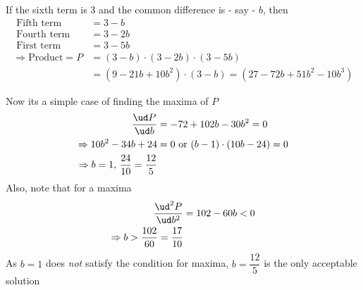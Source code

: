 \begin{solution}
	If the sixth term is 3 and the common difference is - say - $b$, then 
	\begin{align}
		\text{ Fifth term } &= 3-b \\
		\text{ Fourth term } &= 3-2b \\
		\text{ First term } &= 3-5b \\
		\Rightarrow \text{Product} = P &= (3-b)\cdot(3-2b)\cdot(3-5b) \\
		&= (9-21b+10b^2)\cdot(3-b) = (27-72b+51b^2-10b^3)
	\end{align}
	
	Now its a simple case of finding the maxima of $P$
	\begin{align}
		\dfrac{\ud P}{\ud b} &= -72 + 102b - 30b^2 = 0 \\
		\Rightarrow 10b^2 - 34b + 24 &= 0 \text{ or } (b-1)\cdot(10b-24) = 0 \\
		\Rightarrow b = 1,\, \frac{24}{10} = \frac{12}{5}
	\end{align}
	Also, note that for a maxima
	\begin{align}
		\dfrac{\ud^2 P}{\ud b^2} &= 102 - 60b < 0 \\
		\Rightarrow b > \frac{102}{60} = \frac{17}{10}
	\end{align}
	As $b = 1$ does \textit{not} satisfy the condition for maxima, $b = \dfrac{12}{5}$ is 
	the only acceptable solution
\end{solution}
